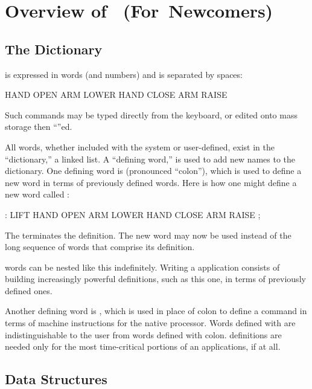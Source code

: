 \appendix{}
\chapter{Overview of~\Forth{} (For~Newcomers)}

\section{The Dictionary}%
%
%

\Forth{} is expressed in words (and numbers) and is separated by spaces:
\begin{Code}
HAND OPEN  ARM LOWER  HAND CLOSE  ARM RAISE 
\end{Code}
Such commands may be typed directly from the keyboard, or edited onto 
mass storage then ``''ed.

All words, whether included with the system or user-defined, exist in the
``dictionary,'' a linked list.  A ``defining word,'' is used to add new
names to the dictionary.  One defining word is \forthb{:} (pronounced
``colon''), which is used to define a new word in terms of previously
defined words.  Here is how one might define a new word called :
\begin{Code}
: LIFT   HAND OPEN  ARM LOWER  HAND CLOSE  ARM RAISE ;
\end{Code}
The \forthb{;} terminates the definition.  The new word  may
now be used instead of the long sequence of words that comprise its
definition.

\Forth{} words can be nested like this indefinitely.  Writing a 
\Forth{} application consists of building increasingly powerful definitions,
such as this one, in terms of previously defined ones.

Another defining word is ,
which is used in place of colon to define a command in terms of machine
instructions for the native processor.  Words defined with 
are indistinguishable to the user from words defined with colon.
 definitions are needed only for the most time-critical
portions of an applications, if at all.

\section{Data Structures}%
%

